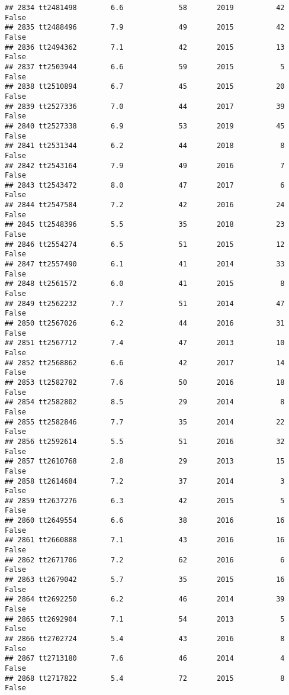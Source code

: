 \documentclass[
]{article}
\begin{document}
\begin{verbatim}
## 2834 tt2481498        6.6             58       2019          42   False
## 2835 tt2488496        7.9             49       2015          42   False
## 2836 tt2494362        7.1             42       2015          13   False
## 2837 tt2503944        6.6             59       2015           5   False
## 2838 tt2510894        6.7             45       2015          20   False
## 2839 tt2527336        7.0             44       2017          39   False
## 2840 tt2527338        6.9             53       2019          45   False
## 2841 tt2531344        6.2             44       2018           8   False
## 2842 tt2543164        7.9             49       2016           7   False
## 2843 tt2543472        8.0             47       2017           6   False
## 2844 tt2547584        7.2             42       2016          24   False
## 2845 tt2548396        5.5             35       2018          23   False
## 2846 tt2554274        6.5             51       2015          12   False
## 2847 tt2557490        6.1             41       2014          33   False
## 2848 tt2561572        6.0             41       2015           8   False
## 2849 tt2562232        7.7             51       2014          47   False
## 2850 tt2567026        6.2             44       2016          31   False
## 2851 tt2567712        7.4             47       2013          10   False
## 2852 tt2568862        6.6             42       2017          14   False
## 2853 tt2582782        7.6             50       2016          18   False
## 2854 tt2582802        8.5             29       2014           8   False
## 2855 tt2582846        7.7             35       2014          22   False
## 2856 tt2592614        5.5             51       2016          32   False
## 2857 tt2610768        2.8             29       2013          15   False
## 2858 tt2614684        7.2             37       2014           3   False
## 2859 tt2637276        6.3             42       2015           5   False
## 2860 tt2649554        6.6             38       2016          16   False
## 2861 tt2660888        7.1             43       2016          16   False
## 2862 tt2671706        7.2             62       2016           6   False
## 2863 tt2679042        5.7             35       2015          16   False
## 2864 tt2692250        6.2             46       2014          39   False
## 2865 tt2692904        7.1             54       2013           5   False
## 2866 tt2702724        5.4             43       2016           8   False
## 2867 tt2713180        7.6             46       2014           4   False
## 2868 tt2717822        5.4             72       2015           8   False

\end{verbatim}
\end{document}
